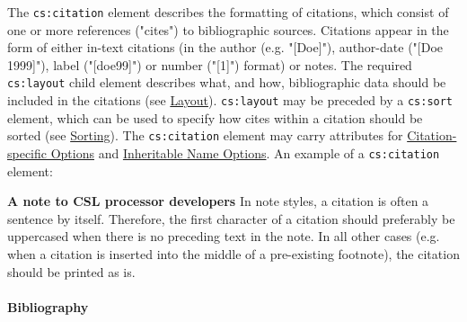 The \texttt{cs:citation} element describes the formatting of citations,
which consist of one or more references ("cites") to bibliographic
sources. Citations appear in the form of either in-text citations (in
the author (e.g. "{[}Doe{]}"), author-date ("{[}Doe 1999{]}"), label
("{[}doe99{]}") or number ("{[}1{]}") format) or notes. The required
\texttt{cs:layout} child element describes what, and how, bibliographic
data should be included in the citations (see
\protect\hyperlink{layout}{Layout}). \texttt{cs:layout} may be preceded
by a \texttt{cs:sort} element, which can be used to specify how cites
within a citation should be sorted (see
\protect\hyperlink{sorting}{Sorting}). The \texttt{cs:citation} element
may carry attributes for
\protect\hyperlink{citation-specific-options}{Citation-specific Options}
and \protect\hyperlink{inheritable-name-options}{Inheritable Name
Options}. An example of a \texttt{cs:citation} element:

\begin{Shaded}
\begin{Highlighting}[]
\NormalTok{\textless{}}\NormalTok{\textgreater{}}
\NormalTok{  \textless{}}\NormalTok{\textgreater{}}
\NormalTok{    \textless{}}\NormalTok{/\textgreater{}}
\NormalTok{  \textless{}/}\NormalTok{\textgreater{}}
\NormalTok{  \textless{}}\NormalTok{\textgreater{}}
\NormalTok{    \textless{}}\NormalTok{/\textgreater{}}
\NormalTok{  \textless{}/}\NormalTok{\textgreater{}}
\NormalTok{\textless{}/}\NormalTok{\textgreater{}}
\end{Highlighting}
\end{Shaded}

\textbf{A note to CSL processor developers} In note styles, a citation
is often a sentence by itself. Therefore, the first character of a
citation should preferably be uppercased when there is no preceding text
in the note. In all other cases (e.g. when a citation is inserted into
the middle of a pre-existing footnote), the citation should be printed
as is.

\hypertarget{bibliography}{%
\paragraph{Bibliography}\label{bibliography}}


